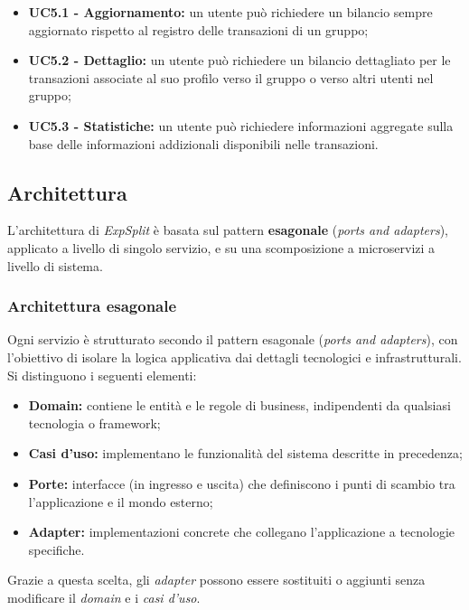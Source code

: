 \begin{itemize}
\begin{itemize}
            \item \textbf{UC5.1 - Aggiornamento:} un utente può richiedere un bilancio sempre aggiornato rispetto al registro delle transazioni di un gruppo;
            \item \textbf{UC5.2 - Dettaglio:} un utente può richiedere un bilancio dettagliato per le transazioni associate al suo profilo verso il gruppo o verso altri utenti nel gruppo;
            \item \textbf{UC5.3 - Statistiche:} un utente può richiedere informazioni aggregate sulla base delle informazioni addizionali disponibili nelle transazioni.
        \end{itemize}
\end{itemize}

\subsection{Architettura}
L'architettura di \emph{ExpSplit} è basata sul pattern \textbf{esagonale} (\emph{ports and adapters}), applicato a livello di singolo servizio, e su una scomposizione a microservizi a livello di sistema.

\subsubsection{Architettura esagonale}
Ogni servizio è strutturato secondo il pattern esagonale (\emph{ports and adapters}), con l'obiettivo di isolare la logica applicativa dai dettagli tecnologici e infrastrutturali. Si distinguono i seguenti elementi:

\begin{itemize}
    \item \textbf{Domain:} contiene le entità e le regole di business, indipendenti da qualsiasi tecnologia o framework;
    \item \textbf{Casi d'uso:} implementano le funzionalità del sistema descritte in precedenza;
    \item \textbf{Porte:} interfacce (in ingresso e uscita) che definiscono i punti di scambio tra l'applicazione e il mondo esterno;
    \item \textbf{Adapter:} implementazioni concrete che collegano l'applicazione a tecnologie specifiche.
\end{itemize}

Grazie a questa scelta, gli \emph{adapter} possono essere sostituiti o aggiunti senza modificare il \emph{domain} e i \emph{casi d'uso}.

